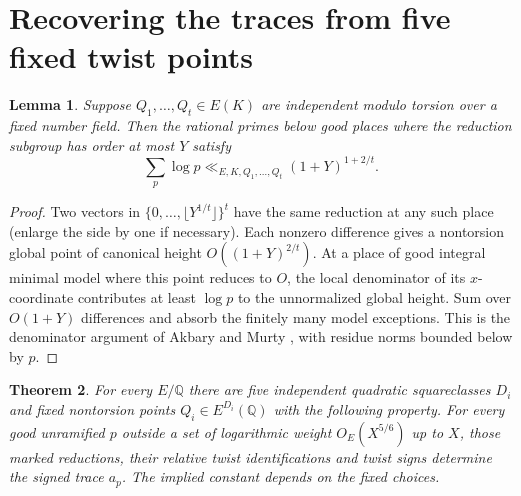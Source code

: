 \documentclass[11pt]{article}
\newtheorem{theorem}{Theorem}[section]\newtheorem{prop}[theorem]{Proposition}
\newtheorem{lemma}[theorem]{Lemma}
\newcommand{\Q}{\mathbb Q}\newcommand{\Z}{\mathbb Z}\newcommand{\F}{\mathbb F}
\begin{document}
\section{Recovering the traces from five fixed twist points}
\begin{lemma}\label{small}
Suppose $Q_1,\ldots,Q_t\in E(K)$ are independent modulo torsion over a fixed number field. Then the rational primes below good places where the reduction subgroup has order at most $Y$ satisfy
\[
 \sum_{p}\log p\ll_{E,K,Q_1,\ldots,Q_t}(1+Y)^{1+2/t}.
\]
\end{lemma}
\begin{proof}
Two vectors in $\{0,\ldots,\lfloor Y^{1/t}\rfloor\}^t$ have the same reduction at any such place (enlarge the side by one if necessary). Each nonzero difference gives a nontorsion global point of canonical height $O((1+Y)^{2/t})$. At a place of good integral minimal model where this point reduces to $O$, the local denominator of its $x$-coordinate contributes at least $\log p$ to the unnormalized global height. Sum over $O(1+Y)$ differences and absorb the finitely many model exceptions. This is the denominator argument of Akbary and Murty \cite[proof of Proposition 1.2]{AM}, with residue norms bounded below by $p$.
\end{proof}
\begin{theorem}
For every $E/\Q$ there are five independent quadratic squareclasses $D_i$ and fixed nontorsion points $Q_i\in E^{D_i}(\Q)$ with the following property. For every good unramified $p$ outside a set of logarithmic weight $O_E(X^{5/6})$ up to $X$, those marked reductions, their relative twist identifications and twist signs determine the signed trace $a_p$. The implied constant depends on the fixed choices.
\end{theorem}
\end{document}
